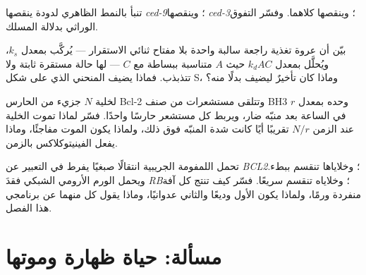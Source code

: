 \begin{exercise}[$\star\star$]\label{exo:b3:cell-cycle-apoptosis:9}
تنبأ بالنمط الظاهري لدودة ينقصها \emph{ced-9}؛ وينقصها
\emph{ced-3}؛ وينقصها كلاهما. وفسّر التفوق الوراثي بدلالة
المسلك.
\end{exercise}

\begin{exercise}[$\star\star\star$]\label{exo:b3:cell-cycle-apoptosis:10}
بيّن أن عروة تغذية راجعة سالبة واحدة بلا مفتاح ثنائي الاستقرار
---  يُركَّب بمعدل $k_{s}$، ويُحلَّل بمعدل $k_{d}AC$ حيث $A$
متناسبة ببساطة مع $C$ --- لها حالة مستقرة ثابتة ولا
تتذبذب. فماذا يضيف المنحني الذي على شكل S، وماذا كان تأخيرٌ
ليضيف بدلًا منه؟
\end{exercise}

\begin{exercise}[$\star\star\star$]\label{exo:b3:cell-cycle-apoptosis:11}
لخلية $N$ جزيء من الحارس Bcl-2 وتتلقى مستشعرات من صنف BH3
وحده بمعدل $r$ في الساعة بعد منبّه ضار، ويربط كل مستشعر
حارسًا واحدًا. فسّر لماذا تموت الخلية عند الزمن $N/r$ تقريبًا
أيًا كانت شدة المنبّه فوق ذلك، ولماذا يكون الموت مفاجئًا،
وماذا يفعل الفينيتوكلاكس بالزمن.
\end{exercise}

\begin{exercise}[$\star\star\star$]\label{exo:b3:cell-cycle-apoptosis:12}
تحمل اللمفومة الجريبية انتقالًا صبغيًا يفرط في التعبير عن
\emph{BCL2}؛ وخلاياها تنقسم ببطء. ويحمل الورم الأرومي الشبكي فقدَ
\emph{RB}؛ وخلاياه تنقسم سريعًا. فسّر كيف تنتج كل آفة منفردة
ورمًا، ولماذا يكون الأول وديعًا والثاني عدوانيًا،
وماذا يقول كل منهما عن برنامجي هذا الفصل.
\end{exercise}

\section{مسألة: حياة ظهارة وموتها}

